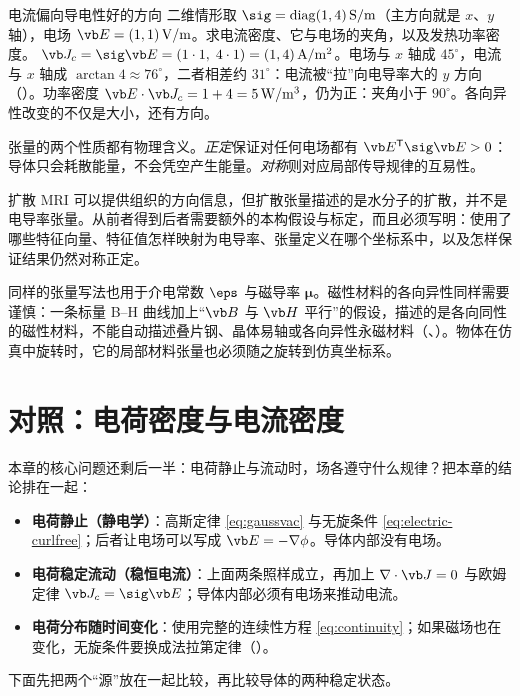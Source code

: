 \begin{example}{电流偏向导电性好的方向}\label{ex:electric-aniso}
二维情形取 $\sig=\mathrm{diag}(1,4)\,\mathrm{S/m}$（主方向就是 $x$、$y$ 轴），电场 $\vb E=(1,1)\,\mathrm{V/m}$。求电流密度、它与电场的夹角，以及发热功率密度。
\solution
$\vb J_c=\sig\vb E=(1\cdot1,\;4\cdot1)=(1,4)\,\mathrm{A/m^2}$。电场与 $x$ 轴成 $45^\circ$，电流与 $x$ 轴成 $\arctan4\approx76^\circ$，二者相差约 $31^\circ$：电流被“拉”向电导率大的 $y$ 方向（）。功率密度 $\vb E\cdot\vb J_c=1+4=5\,\mathrm{W/m^3}$，仍为正：夹角小于 $90^\circ$。各向异性改变的不仅是大小，还有方向。
\end{example}


张量的两个性质都有物理含义。\emph{正定}保证对任何电场都有 $\vb E^{\mathsf T}\sig\vb E>0$：导体只会耗散能量，不会凭空产生能量。\emph{对称}则对应局部传导规律的互易性。

\begin{pitfall}
扩散 MRI 可以提供组织的方向信息，但扩散张量描述的是水分子的扩散，并不是电导率张量。从前者得到后者需要额外的本构假设与标定，而且必须写明：使用了哪些特征向量、特征值怎样映射为电导率、张量定义在哪个坐标系中，以及怎样保证结果仍然对称正定。
\end{pitfall}

\begin{deeper}[张量材料的一般注意事项]
同样的张量写法也用于介电常数 $\eps$ 与磁导率 $\boldsymbol\mu$。磁性材料的各向异性同样需要谨慎：一条标量 B--H 曲线加上“$\vb B$ 与 $\vb H$ 平行”的假设，描述的是各向同性的磁性材料，不能自动描述叠片钢、晶体易轴或各向异性永磁材料（、）。物体在仿真中旋转时，它的局部材料张量也必须随之旋转到仿真坐标系。
\end{deeper}

\section{对照：电荷密度与电流密度}\label{sec:electric-compare}

本章的核心问题还剩后一半：电荷静止与流动时，场各遵守什么规律？把本章的结论排在一起：
\begin{itemize}
\item \textbf{电荷静止（静电学）}：高斯定律 \eqref{eq:gaussvac} 与无旋条件 \eqref{eq:electric-curlfree}；后者让电场可以写成 $\vb E=-\nabla\phi$。导体内部没有电场。
\item \textbf{电荷稳定流动（稳恒电流）}：上面两条照样成立，再加上 $\nabla\cdot\vb J=0$ 与欧姆定律 $\vb J_c=\sig\vb E$；导体内部必须有电场来推动电流。
\item \textbf{电荷分布随时间变化}：使用完整的连续性方程 \eqref{eq:continuity}；如果磁场也在变化，无旋条件要换成法拉第定律（）。
\end{itemize}
下面先把两个“源”放在一起比较，再比较导体的两种稳定状态。

